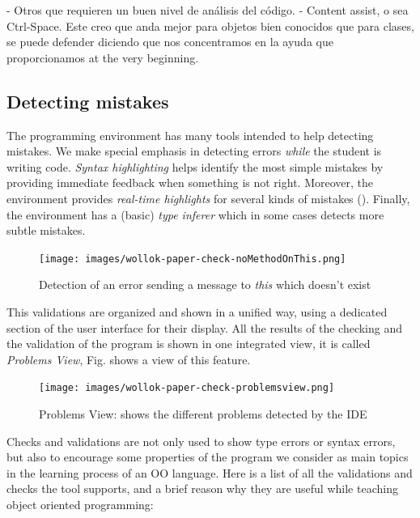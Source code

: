 - Otros que requieren un buen nivel de análisis del código.
  - Content assist, o sea Ctrl-Space. Este creo que anda mejor para objetos bien conocidos que para clases, se puede defender diciendo que nos concentramos en la ayuda que proporcionamos at the very beginning.
 

\subsection{Detecting mistakes}
The programming environment has many tools intended to help detecting mistakes.
We make special emphasis in detecting errors \emph{while} the student is writing code. 
\emph{Syntax highlighting} helps identify the most simple mistakes by providing immediate feedback when something is not right. 
Moreover, the environment provides \emph{real-time highlights} for several kinds of mistakes (\cf {}).
Finally, the environment has a (basic) \emph{type inferer} which in some cases detects more subtle mistakes.

\begin{figure}[ht]
    \centering
	\texttt{[image: images/wollok-paper-check-noMethodOnThis.png]}
    \caption{Detection of an error sending a message to \emph{this} which doesn't exist}
    \label{fig:check-noMethodOnThis.png}
\end{figure}


This validations are organized and shown in a unified way, using a dedicated section of the user interface for their display.
All the results of the checking and the validation of the program is shown in one integrated view, it is called \emph{Problems View}, Fig.  shows a view of this feature. 

\begin{figure}[ht]
    \centering
	\texttt{[image: images/wollok-paper-check-problemsview.png]}
    \caption{Problems View: shows the different problems detected by the IDE }
    \label{fig:problemsview.png}
\end{figure}

Checks and validations are not only used to show type errors or syntax errors, 
but also to encourage some properties of the program we consider as main topics in the learning process of an OO language.
Here is a list of all the validations and checks the tool supports, and a brief reason why they are useful while teaching object oriented programming:

